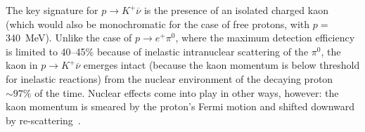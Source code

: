 
The key signature for $p\to K^+\overline{\nu}$ is the presence of an
isolated charged kaon (which would also be monochromatic 
for the case of free protons, with $p=$\SI{340}{\MeV}).  
Unlike the case of $p\to e^+\pi^0$, where the maximum
detection efficiency is limited to 40--45\% because of inelastic
intranuclear scattering of the $\pi^0$, the kaon in $p\to
K^+\overline{\nu}$ emerges intact (because the kaon momentum is 
below threshold for inelastic reactions)
from the nuclear environment of the decaying proton $\sim 97\%$ of the
time.  Nuclear effects come into play in other ways, however: the kaon
momentum is smeared by the proton's Fermi motion and shifted downward
by re-scattering~\cite{Stefan:2008zi}. 


